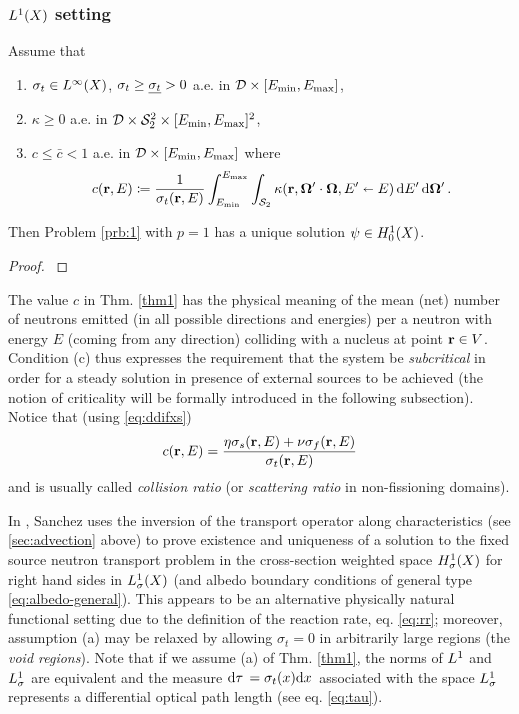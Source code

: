 \subsubsection{$\Lp[1](X)$ setting}
\begin{theorem}\label{thm1}
Assume that
\begin{enumerate}[label=(\alph*)]
	\item $\sigma_t \in \Lp[\infty](X)$, $\sigma_t \geq \mst > 0$ a.e. in $\VV\times[\Emin,\Emax]$,
	\item $\kappa \geq 0$ a.e. in $\VV\times\Sphere^2\times[\Emin,\Emax]^2$,
	\item $\displaystyle c \leq \bar c < 1$ a.e. in $\VV\times[\Emin,\Emax]$ where
	  \begin{equation}\label{eq:c}
	    c(\br,E) \coloneqq \frac{1}{\sigma_t(\br,E)}\int_{\Emin}^{\Emax}\int_{\Sphere} \kappa(\br,\bomega'\cdot\bomega,
	    E'\sla E)\,\d{E'}\d{\bomega'}.
	  \end{equation}
\end{enumerate}
Then Problem \ref{prb:1} with $p = 1$ has a unique solution $\psi\in\Hpnot[1](X)$.
\end{theorem}
\begin{proof}
\cite[Chap. XXI, \S 2, Proposition 5]{DautrayLions}
\end{proof}

The value $c$ in Thm. \ref{thm1} has the physical meaning of the mean (net) number of neutrons emitted (in all possible
directions and energies) per a neutron with energy $E$ (coming from any direction) colliding with a nucleus at point
\mbox{$\br\in V$}. 
Condition (c) thus expresses the requirement that the system be \textit{subcritical} in order for a
steady solution in presence of external sources to be achieved (the notion of criticality will be formally introduced in the following
subsection).
Notice that (using \eqref{eq:ddifxs})
\begin{equation}\label{eq:scattering_ratio}
	c(\br,E) = \frac{\eta\sigma_s(\br,E) + \nu\sigma_f(\br,E)}{\sigma_t(\br,E)}
\end{equation}
and is usually called \textit{collision ratio}  (or
\textit{scattering ratio} in non-fissioning domains).

 In \cite{Sanchez3}, Sanchez uses the inversion of the transport operator along characteristics (see \ref{sec:advection}
 above) to prove existence and uniqueness of a solution to the fixed source neutron transport problem in
 the cross-section weighted space $\Hp[1]_{\sigma}(X)$ for right hand sides in $\Lp[1]_{\sigma}(X)$ (and albedo
 boundary conditions of general type \eqref{eq:albedo-general}).
 This appears to be an alternative physically natural functional setting due to the definition of the reaction rate, eq. 
 \eqref{eq:rr}; moreover, assumption (a) may be relaxed by allowing $\sigma_t = 0$ in arbitrarily large regions 
  (the \textit{void regions}). Note that if we assume (a) of Thm. \ref{thm1}, the norms of $\Lp[1]$ and
  $\Lp[1]_{\sigma}$ are equivalent and the measure $\d{\tau} = \sigma_t(x) \d{x}$ associated with the space
  $\Lp[1]_{\sigma}$ represents a differential optical path length (see eq. \eqref{eq:tau}).

